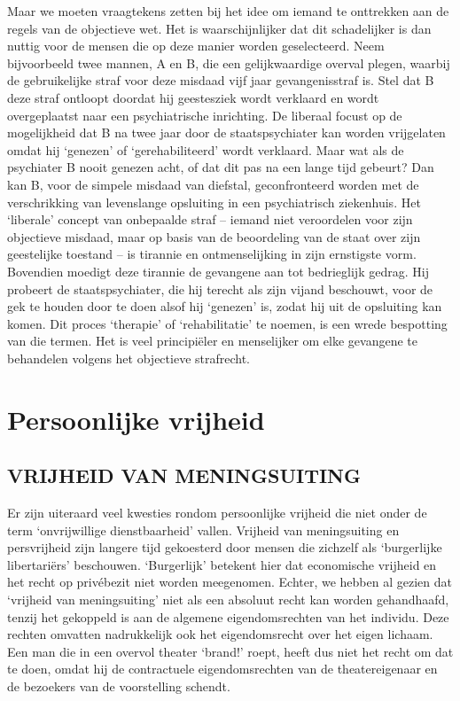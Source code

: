 \documentclass[
  a5paper,
  smalldemyvopaper,10pt,twoside,onecolumn,openright,extrafontsizes,hidelinks]{memoir}
\begin{document}
Maar we moeten vraagtekens zetten bij het idee om iemand te onttrekken
aan de regels van de objectieve wet. Het is waarschijnlijker dat dit
schadelijker is dan nuttig voor de mensen die op deze manier worden
geselecteerd. Neem bijvoorbeeld twee mannen, A en B, die een
gelijkwaardige overval plegen, waarbij de gebruikelijke straf voor deze
misdaad vijf jaar gevangenisstraf is. Stel dat B deze straf ontloopt
doordat hij geestesziek wordt verklaard en wordt overgeplaatst naar een
psychiatrische inrichting. De liberaal focust op de mogelijkheid dat B
na twee jaar door de staatspsychiater kan worden vrijgelaten omdat hij
`genezen' of `gerehabiliteerd' wordt verklaard. Maar wat als de
psychiater B nooit genezen acht, of dat dit pas na een lange tijd
gebeurt? Dan kan B, voor de simpele misdaad van diefstal, geconfronteerd
worden met de verschrikking van levenslange opsluiting in een
psychiatrisch ziekenhuis. Het `liberale' concept van onbepaalde straf --
iemand niet veroordelen voor zijn objectieve misdaad, maar op basis van
de beoordeling van de staat over zijn geestelijke toestand -- is
tirannie en ontmenselijking in zijn ernstigste vorm. Bovendien moedigt
deze tirannie de gevangene aan tot bedrieglijk gedrag. Hij probeert de
staatspsychiater, die hij terecht als zijn vijand beschouwt, voor de gek
te houden door te doen alsof hij `genezen' is, zodat hij uit de
opsluiting kan komen. Dit proces `therapie' of `rehabilitatie' te
noemen, is een wrede bespotting van die termen. Het is veel principiëler
en menselijker om elke gevangene te behandelen volgens het objectieve
strafrecht.


\chapter{Persoonlijke vrijheid}\label{persoonlijke-vrijheid}

\section{VRIJHEID VAN MENINGSUITING}\label{vrijheid-van-meningsuiting}

Er zijn uiteraard veel kwesties rondom persoonlijke vrijheid die niet
onder de term `onvrijwillige dienstbaarheid' vallen. Vrijheid van
meningsuiting en persvrijheid zijn langere tijd gekoesterd door mensen
die zichzelf als `burgerlijke libertariërs' beschouwen. `Burgerlijk'
betekent hier dat economische vrijheid en het recht op privébezit niet
worden meegenomen. Echter, we hebben al gezien dat `vrijheid van
meningsuiting' niet als een absoluut recht kan worden gehandhaafd,
tenzij het gekoppeld is aan de algemene eigendomsrechten van het
individu. Deze rechten omvatten nadrukkelijk ook het eigendomsrecht over
het eigen lichaam. Een man die in een overvol theater `brand!' roept,
heeft dus niet het recht om dat te doen, omdat hij de contractuele
eigendomsrechten van de theatereigenaar en de bezoekers van de
voorstelling schendt.
\end{document}
